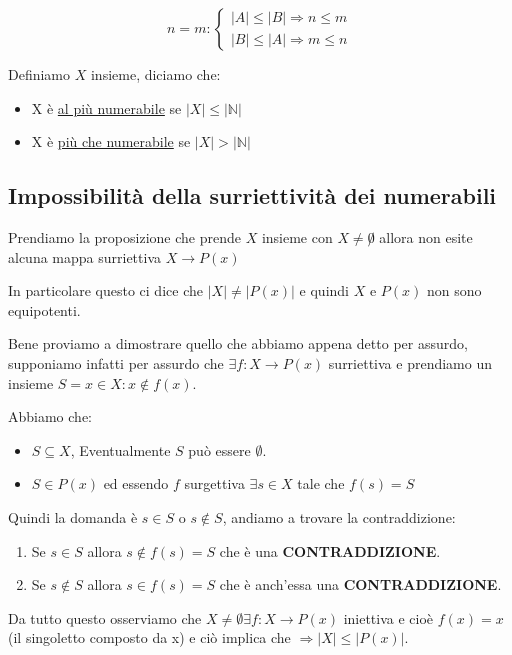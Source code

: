 \documentclass{article}
\theoremstyle{definition}
\begin{document}
\[n=m :
\begin{cases}
        |A| \le |B| \Rightarrow n \le m \\
        |B| \le |A| \Rightarrow m \le n
\end{cases}
\]


Definiamo $X$ insieme, diciamo che:
\begin{itemize}
        \item X è \underline{al più numerabile} se $|X| \le |\mathbb{N}|$	
        \item X è \underline{più che numerabile} se $|X| > |\mathbb{N}|$
\end{itemize}



\subsection{Impossibilità della surriettività dei numerabili}
Prendiamo la proposizione che prende $X$ insieme con $X \not =  \not 0$ allora non esite alcuna mappa surriettiva $X \to P(x)$ \par
In particolare questo ci dice che $|X| \not = |P(x)|$ e quindi $X$ e $P(x)$ non sono equipotenti.

Bene proviamo a dimostrare quello che abbiamo appena detto per assurdo, supponiamo infatti per assurdo che $\exists f : X \to P(x)$ surriettiva e prendiamo un insieme $S = {x \in X : x \not \in f(x)}$. \par 
Abbiamo che:
\begin{itemize}
        \item $S \subseteq X$, Eventualmente $S$ può essere $\emptyset$.
        \item $S \in P(x)$ ed essendo $f$ surgettiva $\exists s \in X$ tale che $f(s) = S$ 
\end{itemize}
Quindi la domanda è $s \in S$ o $s \not \in S$, andiamo a trovare la contraddizione:
\begin{enumerate}
        \item Se $s \in S$ allora $s \not \in f(s) = S$ che è una \textbf{CONTRADDIZIONE}.
        \item Se $s \not \in S$ allora $s \in f(s) = S$ che è anch'essa una \textbf{CONTRADDIZIONE}.
\end{enumerate}

Da tutto questo osserviamo che $X \not = \emptyset \exists f : X \to P(x)$ iniettiva e cioè $f(x) = {x}$ (il singoletto composto da x) e ciò implica che $\Rightarrow |X| \le |P(x)|$. 
\end{document}
